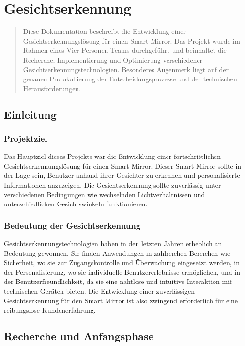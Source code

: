 \chapter{Gesichtserkennung}

\begin{abstract}
Diese Dokumentation beschreibt die Entwicklung einer Gesichtserkennungslösung für einen Smart Mirror. Das Projekt wurde im Rahmen eines Vier-Personen-Teams durchgeführt und beinhaltet die Recherche, Implementierung und Optimierung verschiedener Gesichtserkennungstechnologien. Besonderes Augenmerk liegt auf der genauen Protokollierung der Entscheidungsprozesse und der technischen Herausforderungen.
\end{abstract}



\section{Einleitung}

\subsection{Projektziel}
Das Hauptziel dieses Projekts war die Entwicklung einer fortschrittlichen Gesichtserkennungslösung für einen Smart Mirror. Dieser Smart Mirror sollte in der Lage sein, Benutzer anhand ihrer Gesichter zu erkennen und personalisierte Informationen anzuzeigen. Die Gesichtserkennung sollte zuverlässig unter verschiedenen Bedingungen wie wechselnden Lichtverhältnissen und unterschiedlichen Gesichtswinkeln funktionieren.

\subsection{Bedeutung der Gesichtserkennung}
Gesichtserkennungstechnologien haben in den letzten Jahren erheblich an Bedeutung gewonnen. Sie finden Anwendungen in zahlreichen Bereichen wie Sicherheit, wo sie zur Zugangskontrolle und Überwachung eingesetzt werden, in der Personalisierung, wo sie individuelle Benutzererlebnisse ermöglichen, und in der Benutzerfreundlichkeit, da sie eine nahtlose und intuitive Interaktion mit technischen Geräten bieten. Die Entwicklung einer zuverlässigen Gesichtserkennung für den Smart Mirror ist also zwingend erforderlich für eine reibungslose Kundenerfahrung.



\section{Recherche und Anfangsphase}

